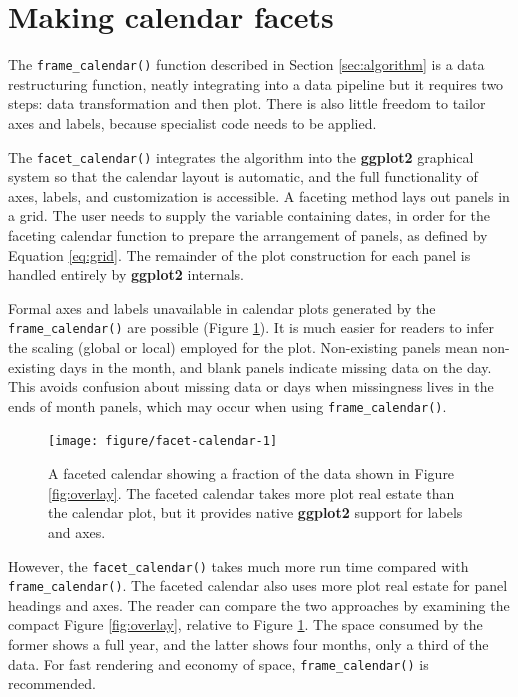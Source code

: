 \documentclass[12pt]{article}
\begin{document}
\hypertarget{sec:facet-calendar}{%
\section{Making calendar facets}\label{sec:facet-calendar}}

The \texttt{frame\_calendar()} function described in Section \ref{sec:algorithm} is a data restructuring function, neatly integrating into a data pipeline but it requires two steps: data transformation and then plot. There is also little freedom to tailor axes and labels, because specialist code needs to be applied.

The \texttt{facet\_calendar()} integrates the algorithm into the \textbf{ggplot2} graphical system so that the calendar layout is automatic, and the full functionality of axes, labels, and customization is accessible. A faceting method lays out panels in a grid. The user needs to supply the variable containing dates, in order for the faceting calendar function to prepare the arrangement of panels, as defined by Equation \eqref{eq:grid}. The remainder of the plot construction for each panel is handled entirely by \textbf{ggplot2} internals.

Formal axes and labels unavailable in calendar plots generated by the \texttt{frame\_calendar()} are possible (Figure \ref{fig:facet-calendar}). It is much easier for readers to infer the scaling (global or local) employed for the plot. Non-existing panels mean non-existing days in the month, and blank panels indicate missing data on the day. This avoids confusion about missing data or days when missingness lives in the ends of month panels, which may occur when using \texttt{frame\_calendar()}.

\begin{figure}

{\centering \texttt{[image: figure/facet-calendar-1]} 

}

\caption{A faceted calendar showing a fraction of the data shown in Figure \ref{fig:overlay}. The faceted calendar takes more plot real estate than the calendar plot, but it provides native \textbf{ggplot2} support for labels and axes.}\label{fig:facet-calendar}
\end{figure}



However, the \texttt{facet\_calendar()} takes much more run time compared with \texttt{frame\_calendar()}. The faceted calendar also uses more plot real estate for panel headings and axes. The reader can compare the two approaches by examining the compact Figure \ref{fig:overlay}, relative to Figure \ref{fig:facet-calendar}. The space consumed by the former shows a full year, and the latter shows four months, only a third of the data. For fast rendering and economy of space, \texttt{frame\_calendar()} is recommended.
\end{document}
